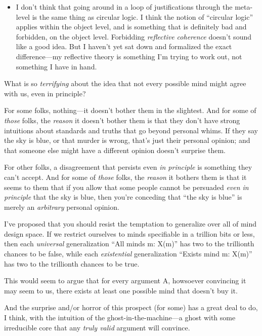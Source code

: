 \begin{itemize}
\item {
 I don't think that going around in a loop of
justifications through the meta-level is the same thing as circular
logic. I think the notion of ``circular
logic'' applies within the object level, and is
something that is definitely bad and forbidden, on the object level.
Forbidding \textit{reflective coherence} doesn't sound
like a good idea. But I haven't yet sat down and
formalized the exact difference---my reflective theory is something
I'm trying to work out, not something I have in hand.}
\end{itemize}

\myendsectiontext


{
 What is so \textit{terrifying} about the idea that not every
possible mind might agree with us, even in principle? }

{
 For some folks, nothing---it doesn't bother them
in the slightest. And for some of \textit{those} folks, the
\textit{reason} it doesn't bother them is that they
don't have strong intuitions about standards and truths
that go beyond personal whims. If they say the sky is blue, or that
murder is wrong, that's just their personal opinion;
and that someone else might have a different opinion
doesn't surprise them.}

{
 For other folks, a disagreement that persists even \textit{in
principle} is something they can't accept. And for some
of \textit{those} folks, the \textit{reason} it bothers them is that it
seems to them that if you allow that some people cannot be persuaded
\textit{even in principle} that the sky is blue, then
you're conceding that ``the sky is
blue'' is merely an \textit{arbitrary} personal
opinion.}

{
 I've proposed that you should resist the
temptation to generalize over all of mind design space. If we restrict
ourselves to minds specifiable in a trillion bits or less, then each
\textit{universal} generalization ``All minds m:
X(m)'' has two to the trillionth chances to be false,
while each \textit{existential} generalization
``Exists mind m: X(m)'' has two to
the trillionth chances to be true.}

{
 This would seem to argue that for every argument A, howsoever
convincing it may seem to us, there exists at least one possible mind
that doesn't buy it.}

{
 And the surprise and/or horror of this prospect (for some) has a
great deal to do, I think, with the intuition of the
ghost-in-the-machine---a ghost with some irreducible core that any
\textit{truly valid} argument will convince.}

